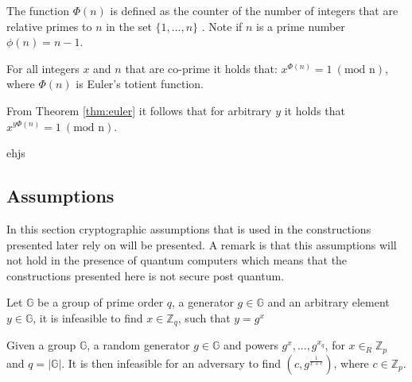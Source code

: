 \begin{Mydef}
The function $\Phi(n)$ is defined as the counter of the number of integers that are relative primes to $n$ in the set $\{1,...,n\}$ . Note if $n$ is a prime number $\phi(n) = n-1$.
\end{Mydef}
\vspace{10pt}
\begin{thm}
\label{thm:euler}
For all integers $x$ and $n$ that are co-prime it holds that:
$x^{\Phi(n)} = 1\:( \text{mod n})$, where $\Phi(n)$ is Euler's totient function.
\end{thm}
\vspace{10pt}
From Theorem \ref{thm:euler} it follows that for arbitrary $y$ it holds that $x^{y\Phi(n)} = 1 \:( \text{mod n})$.
\vspace{10pt}
\begin{Mydef}
ehjs
\end{Mydef}

\subsection*{Assumptions}
In this section cryptographic assumptions that is used in the constructions presented later rely on will be presented. A remark is that this assumptions will not hold in the presence of quantum computers which means that the constructions presented here is not secure post quantum.
\\
\begin{Ass}
Let $\mathds{G}$ be a group of prime order $q$, a generator $g\in \mathds{G}$ and an arbitrary element $y \in\mathds{G}$, it is  infeasible to find $x \in \mathds{Z}_q$, such that $y=g^x$
\end{Ass}
\vspace{10pt}
\begin{Ass}
 Given a group $\mathds{G}$, a random generator $g\in \mathds{G}$ and powers $g^x,...,g^{x_q}$, for $x \in_R \mathds{Z}_p$ and  $q= |\mathds{G}|$. It is then  infeasible for an adversary to find $(c, g^{\frac{1}{x+c}})$, where $c \in \mathds{Z}_p$.
\end{Ass}



